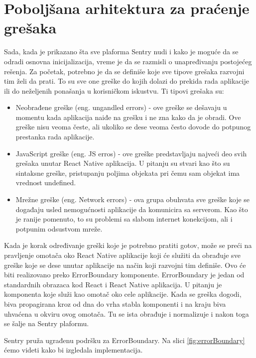 \documentclass[12pt,oneside]{memoir}
\begin{document}
\section{Poboljšana arhitektura za praćenje grešaka}

Sada, kada je prikazano šta sve plaforma Sentry nudi i kako je moguće da se odradi osnovna inicijalizacija, vreme je da se razmisli o unapređivanju postojećeg rešenja. Za početak, potrebno je da se definiše koje sve tipove grešaka razvojni tim želi da prati. To su sve one greške do kojih dolazi do prekida rada aplikacije ili do neželjenih ponašanja u korisničkom iskustvu. Ti tipovi grešaka su:

\begin{itemize}
\item Neobrađene greške (eng. ungandled errors) - ove greške se dešavaju u momentu kada aplikacija naiđe na grešku i ne zna kako da je obradi. Ove greške nisu veoma česte, ali ukoliko se dese veoma često dovode do potpunog prestanka rada aplikacije.
\item JavaScript greške (eng. JS erros) - ove greške predstavljaju najveći deo svih grešaka unutar React Native aplikacija. U pitanju su stvari kao što su sintaksne greške, pristupanju poljima objekata pri čemu sam objekat ima vrednost undefined.
\item Mrežne greške (eng. Network errors) - ova grupa obuhvata sve greške koje se događaju usled nemogućnosti aplikacije da komunicira sa serverom. Kao što je ranije pomenuto, to su problemi sa slabom internet konekcijom, ali i potpunim odsustvom mreže.
\end{itemize}

Kada je korak određivanje greški koje je potrebno pratiti gotov, može se preći na pravljenje omotača oko React Native aplikacije koji će služiti da obrađuje sve greške koje se dese unutar aplikacije na način koji razvojni tim definiše. Ovo će biti realizovano preko ErrorBoundary komponente. ErrorBoundary je jedan od standardnih obrazaca kod React i React Native aplikacija. U pitanju je komponenta koje služi kao omotač oko cele aplikacije. Kada se greška dogodi, biva propagirana kroz od dna do vrha stabla komponenti i na kraju biva uhvaćena u okviru ovog omotača. Tu se ista obrađuje i normalizuje i nakon toga se šalje na Sentry plaformu. \newline

\newline

Sentry pruža ugrađenu podršku za ErrorBoundary. Na slici \ref{fig:errorBoundary} ćemo videti kako bi izgledala implementacija.
\end{document}

